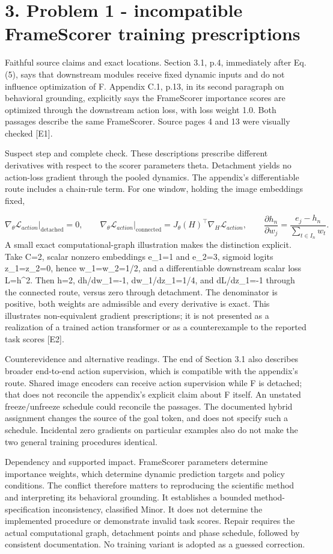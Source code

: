 \documentclass[10pt]{article}
\begin{document}
\section*{3. Problem 1 - incompatible FrameScorer training prescriptions}
Faithful source claims and exact locations. Section 3.1, p.4, immediately after Eq.(5), says that downstream modules receive fixed dynamic inputs and do not influence optimization of F. Appendix C.1, p.13, in its second paragraph on behavioral grounding, explicitly says the FrameScorer importance scores are optimized through the downstream action loss, with loss weight 1.0. Both passages describe the same FrameScorer. Source pages 4 and 13 were visually checked [E1].\par
Suspect step and complete check. These descriptions prescribe different derivatives with respect to the scorer parameters theta. Detachment yields no action-loss gradient through the pooled dynamics. The appendix’s differentiable route includes a chain-rule term. For one window, holding the image embeddings fixed,\par
\[\left.\nabla_\theta \mathcal{L}_{action}\right|_{\mathrm{detached}}=0,\qquad
\left.\nabla_\theta \mathcal{L}_{action}\right|_{\mathrm{connected}}
=J_\theta(H)^\top \nabla_H \mathcal{L}_{action},\qquad
\frac{\partial h_n}{\partial w_j}=\frac{e_j-h_n}{\sum_{t\in I_n}w_t}.\] A small exact computational-graph illustration makes the distinction explicit. Take C=2, scalar nonzero embeddings e\_1=1 and e\_2=3, sigmoid logits z\_1=z\_2=0, hence w\_1=w\_2=1/2, and a differentiable downstream scalar loss L=h\textasciicircum{}2. Then h=2, dh/dw\_1=-1, dw\_1/dz\_1=1/4, and dL/dz\_1=-1 through the connected route, versus zero through detachment. The denominator is positive, both weights are admissible and every derivative is exact. This illustrates non-equivalent gradient prescriptions; it is not presented as a realization of a trained action transformer or as a counterexample to the reported task scores [E2].\par
Counterevidence and alternative readings. The end of Section 3.1 also describes broader end-to-end action supervision, which is compatible with the appendix’s route. Shared image encoders can receive action supervision while F is detached; that does not reconcile the appendix’s explicit claim about F itself. An unstated freeze/unfreeze schedule could reconcile the passages. The documented hybrid assignment changes the source of the goal token, and does not specify such a schedule. Incidental zero gradients on particular examples also do not make the two general training procedures identical.\par
Dependency and supported impact. FrameScorer parameters determine importance weights, which determine dynamic prediction targets and policy conditions. The conflict therefore matters to reproducing the scientific method and interpreting its behavioral grounding. It establishes a bounded method-specification inconsistency, classified Minor. It does not determine the implemented procedure or demonstrate invalid task scores. Repair requires the actual computational graph, detachment points and phase schedule, followed by consistent documentation. No training variant is adopted as a guessed correction.\par
\end{document}
